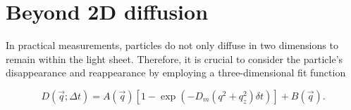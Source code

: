 \section{Beyond 2D diffusion}

In practical measurements, particles do not only diffuse in two dimensions to remain within the light sheet. Therefore, it is
 crucial to consider the particle's disappearance and reappearance by employing a three-dimensional fit function~\cite{PhysRevE.80.031403}

\begin{equation}
    D(\vec{q} ; \Delta t)=A(\vec{q})\left[1-\exp \left(-D_m\left(q^2+q_z^2\right) \delta t\right)\right]+B(\vec{q}).
\end{equation}

